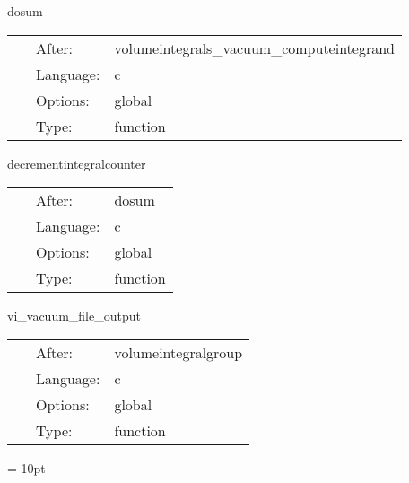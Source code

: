 \vspace{5mm}


\hspace{5mm} dosum 

\hspace{5mm}{\it do sum } 


\hspace{5mm}

 \begin{tabular*}{160mm}{cll} 
~ & After:  & volumeintegrals\_vacuum\_computeintegrand \\ 
~ & Language:  & c \\ 
~ & Options:  & global \\ 
~ & Type:  & function \\ 
\end{tabular*} 


\vspace{5mm}


\hspace{5mm} decrementintegralcounter 

\hspace{5mm}{\it decrement integralcounter variable } 


\hspace{5mm}

 \begin{tabular*}{160mm}{cll} 
~ & After:  & dosum \\ 
~ & Language:  & c \\ 
~ & Options:  & global \\ 
~ & Type:  & function \\ 
\end{tabular*} 


\vspace{5mm}


\hspace{5mm} vi\_vacuum\_file\_output 

\hspace{5mm}{\it output volumeintegral results to disk } 


\hspace{5mm}

 \begin{tabular*}{160mm}{cll} 
~ & After:  & volumeintegralgroup \\ 
~ & Language:  & c \\ 
~ & Options:  & global \\ 
~ & Type:  & function \\ 
\end{tabular*} 



\vspace{5mm}\parskip = 10pt 

